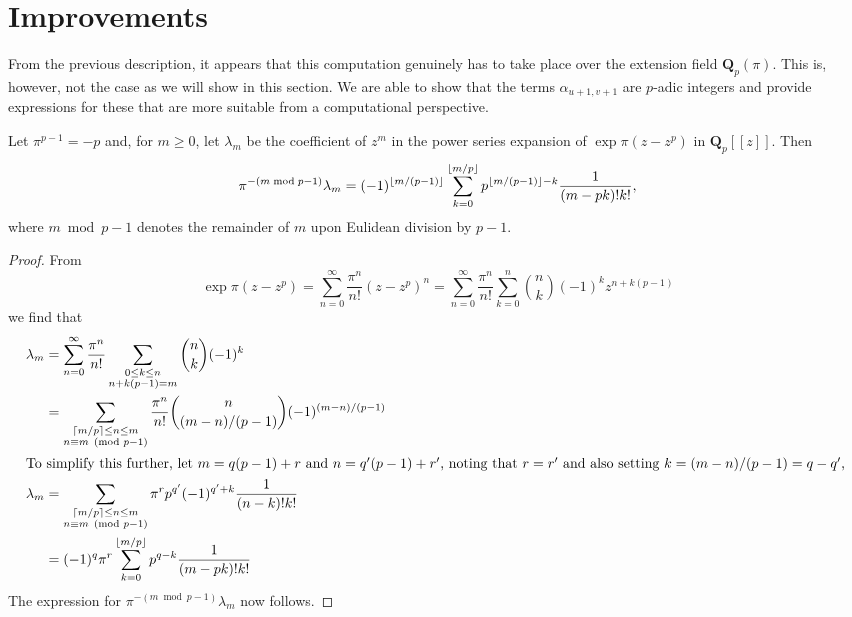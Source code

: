 \section{Improvements}

From the previous description, it appears that this computation 
genuinely has to take place over the extension field 
$\mathbf{Q}_p(\pi)$.  This is, however, not the case as we 
will show in this section.  We are able to show that the terms 
$\alpha_{u+1,v+1}$ are $p$-adic integers and provide expressions 
for these that are more suitable from a computational perspective.  

\begin{lem} \label{lem:lambdam}
Let $\pi^{p-1} = -p$ and, for $m \geq 0$, let $\lambda_m$ 
be the coefficient of $z^m$ in the power series expansion 
of $\exp \pi (z - z^p)$ in $\mathbf{Q}_p[[z]]$.  Then 
\begin{equation*}
\pi^{- (m \bmod {p-1})} \lambda_m = (-1)^{\left\lfloor m/(p-1)\right\rfloor} \sum_{k=0}^{\left\lfloor m/p\right\rfloor} p^{\left\lfloor m/(p-1)\right\rfloor - k} \frac{1}{(m-pk)! k!},
\end{equation*}
where $m \bmod{p-1}$ denotes the remainder of $m$ upon Eulidean 
division by $p-1$.
\end{lem}

\begin{proof}
From
\begin{equation*}
\exp \pi (z - z^p) = \sum_{n=0}^{\infty} \frac{\pi^n}{n!} (z - z^p) ^n
                   = \sum_{n=0}^{\infty} \frac{\pi^n}{n!} \sum_{k=0}^n \binom{n}{k} (-1)^k z^{n + k(p-1)}
\end{equation*}
we find that 
\begin{align*}
\lambda_m & = \sum_{n = 0}^{\infty} \frac{\pi^n}{n!} \sum_{\substack{0 \leq k \leq n\\n + k(p-1) = m}} \binom{n}{k} (-1)^k \\
          & = \sum_{\substack{\left\lceil m/p\right\rceil \leq n \leq m\\ n \equiv m \pmod{p-1}}} \frac{\pi^n}{n!} \binom{n}{(m-n)/(p-1)} (-1)^{(m-n)/(p-1)} \\
\intertext{To simplify this further, let $m = q(p-1) + r$ and 
$n = q'(p-1) + r'$, noting that $r = r'$ and also setting 
$k = (m-n)/(p-1) = q - q'$, }
\lambda_m & = \sum_{\substack{\left\lceil m/p\right\rceil \leq n \leq m\\ n \equiv m \pmod{p-1}}} \pi^r p^{q'} (-1)^{q' + k} \frac{1}{(n-k)! k!} \\
          & = (-1)^q \pi^r \sum_{k=0}^{\left\lfloor m/p\right\rfloor} p^{q - k} \frac{1}{(m - pk)!k!}
\end{align*}
The expression for $\pi^{-(m \bmod{p-1})} \lambda_m$ now follows.
\end{proof}

